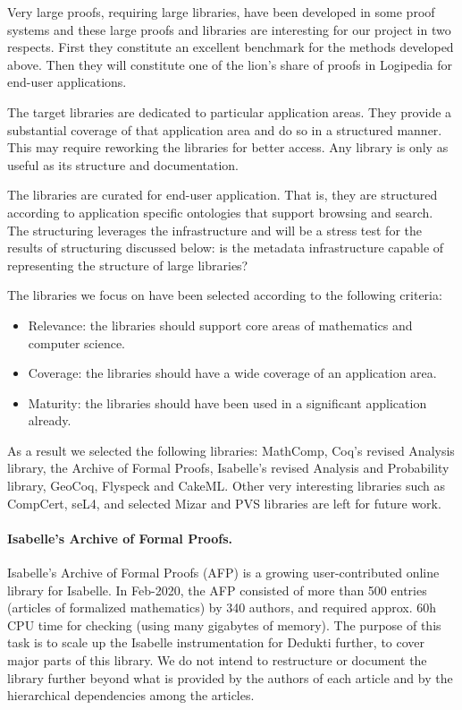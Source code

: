 Very large proofs, requiring large libraries, have been developed in
some proof systems and these large proofs and libraries are
interesting for our project in two respects. First they constitute an
excellent benchmark for the methods developed above. Then they will
constitute one of the lion's share of proofs in Logipedia for end-user
applications.

The target libraries are dedicated to particular application
areas. They provide a substantial coverage of that application area
and do so in a structured manner. This may require reworking the
libraries for better access. Any library is only as useful as its
structure and documentation.

The libraries are curated for end-user application. That is, they are
structured according to application specific ontologies that support
browsing and search. The structuring leverages the infrastructure
and will be a stress test for the results of structuring discussed
below: is the metadata infrastructure capable of representing the
structure of large libraries?

The libraries we focus on have been selected according to the
following criteria:
\begin{itemize}
\item Relevance: the libraries should support core areas of mathematics
  and computer science.
\item Coverage: the libraries should have a wide coverage of an
  application area.
\item Maturity: the libraries should have been used in a significant
  application already.
\end{itemize}

As a result we selected the following libraries: MathComp, Coq's
revised Analysis library, the Archive of Formal Proofs, Isabelle's
revised Analysis and Probability library, GeoCoq, Flyspeck and CakeML.
Other very interesting libraries such as CompCert, seL4, and selected
Mizar and PVS libraries are left for future work.

\paragraph*{Isabelle's Archive of Formal Proofs.}
Isabelle's Archive of Formal Proofs (AFP) \cite{isabelle-afp} is a
growing user-contributed online library for Isabelle. In Feb-2020, the
AFP consisted of more than 500 entries (articles of formalized
mathematics) by 340 authors, and required approx. 60h CPU time for
checking (using many gigabytes of memory).  The purpose of this task
is to scale up the Isabelle instrumentation for Dedukti further, to
cover major parts of this library. We do not intend to restructure or
document the library further beyond what is provided by the authors of
each article and by the hierarchical dependencies among the articles.

